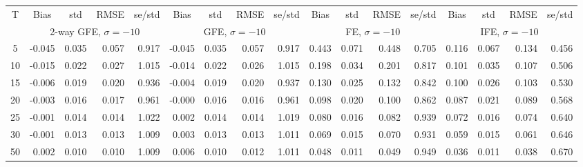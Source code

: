 \begin{tabular}{c r r r r r r r r r r r r r r r r} 
\toprule 
T & \multicolumn{1}{c}{ Bias } & \multicolumn{1}{c}{ std } & \multicolumn{1}{c}{ RMSE } & \multicolumn{1}{c}{ se/std } & \multicolumn{1}{c}{ Bias } & \multicolumn{1}{c}{ std } & \multicolumn{1}{c}{ RMSE } & \multicolumn{1}{c}{ se/std } & \multicolumn{1}{c}{ Bias } & \multicolumn{1}{c}{ std } & \multicolumn{1}{c}{ RMSE } & \multicolumn{1}{c}{ se/std } & \multicolumn{1}{c}{ Bias } & \multicolumn{1}{c}{ std } & \multicolumn{1}{c}{ RMSE } & \multicolumn{1}{c}{ se/std }\\[2pt]
 & \multicolumn{ 4 }{c}{ 2-way GFE, $\sigma{=}-1$0} & \multicolumn{ 4 }{c}{ GFE, $\sigma{=}-1$0} & \multicolumn{ 4 }{c}{ FE, $\sigma{=}-1$0} & \multicolumn{ 4 }{c}{ IFE, $\sigma{=}-1$0}\\[-3pt]
 \cmidrule(lr){2-5}  \cmidrule(lr){6-9}  \cmidrule(lr){10-13}  \cmidrule(lr){14-17}
5 &     -0.045 &      0.035 &      0.057 &      0.917 &     -0.045 &      0.035 &      0.057 &      0.917 &      0.443 &      0.071 &      0.448 &      0.705 &      0.116 &      0.067 &      0.134 &      0.456\\
10 &     -0.015 &      0.022 &      0.027 &      1.015 &     -0.014 &      0.022 &      0.026 &      1.015 &      0.198 &      0.034 &      0.201 &      0.817 &      0.101 &      0.035 &      0.107 &      0.506\\
15 &     -0.006 &      0.019 &      0.020 &      0.936 &     -0.004 &      0.019 &      0.020 &      0.937 &      0.130 &      0.025 &      0.132 &      0.842 &      0.100 &      0.026 &      0.103 &      0.530\\
20 &     -0.003 &      0.016 &      0.017 &      0.961 &     -0.000 &      0.016 &      0.016 &      0.961 &      0.098 &      0.020 &      0.100 &      0.862 &      0.087 &      0.021 &      0.089 &      0.568\\
25 &     -0.001 &      0.014 &      0.014 &      1.022 &      0.002 &      0.014 &      0.014 &      1.019 &      0.080 &      0.016 &      0.082 &      0.939 &      0.072 &      0.016 &      0.074 &      0.640\\
30 &     -0.001 &      0.013 &      0.013 &      1.009 &      0.003 &      0.013 &      0.013 &      1.011 &      0.069 &      0.015 &      0.070 &      0.931 &      0.059 &      0.015 &      0.061 &      0.646\\
50 &      0.002 &      0.010 &      0.010 &      1.009 &      0.006 &      0.010 &      0.012 &      1.011 &      0.048 &      0.011 &      0.049 &      0.949 &      0.036 &      0.011 &      0.038 &      0.670\\[0pt]

\end{tabular}

